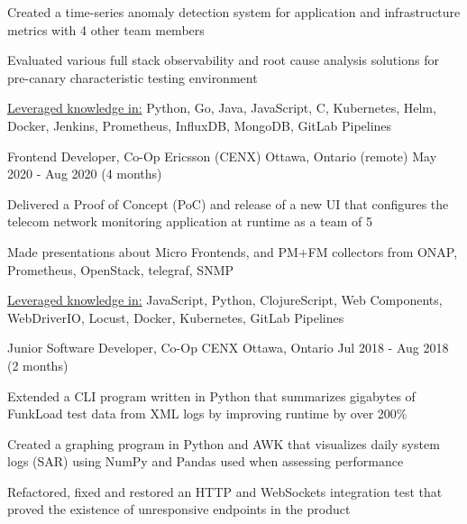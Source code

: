 \begin{cventries}
{\begin{cvitems}
			\item{Created a time-series anomaly detection system for application and infrastructure metrics with 4 other team members}
			\item{Evaluated various full stack observability and root cause analysis solutions for pre-canary characteristic testing environment}
			\item{\underline{Leveraged knowledge in:} Python, Go, Java, JavaScript, C, Kubernetes, Helm, Docker, Jenkins, Prometheus, InfluxDB, MongoDB, GitLab Pipelines}
		\end{cvitems}
	}
	\cventry
	{Frontend Developer, Co-Op}
	{Ericsson (CENX)}
	{Ottawa, Ontario (remote)}
	{May 2020 - Aug 2020 (4 months)}
	{
		\begin{cvitems}
			\item{Delivered a Proof of Concept (PoC) and release of a new UI that configures the telecom network monitoring application at runtime as a team of 5}
			\item{Made presentations about Micro Frontends, and PM+FM collectors from ONAP, Prometheus, OpenStack, telegraf, SNMP}
			\item{\underline{Leveraged knowledge in:} JavaScript, Python, ClojureScript, Web Components, WebDriverIO, Locust, Docker, Kubernetes, GitLab Pipelines}
		\end{cvitems}
	}
	\cventry
	{Junior Software Developer, Co-Op}
	{CENX}
	{Ottawa, Ontario}
	{Jul 2018 - Aug 2018 (2 months)}
	{
		\begin{cvitems}
			\item{Extended a CLI program written in Python that summarizes gigabytes of FunkLoad test data from XML logs by improving runtime by over 200\%}
			\item{Created a graphing program in Python and AWK that visualizes daily system logs (SAR) using NumPy and Pandas used when assessing performance}
			\item{Refactored, fixed and restored an HTTP and WebSockets integration test that proved the existence of unresponsive endpoints in the product}
		\end{cvitems}
	}
\end{cventries}
